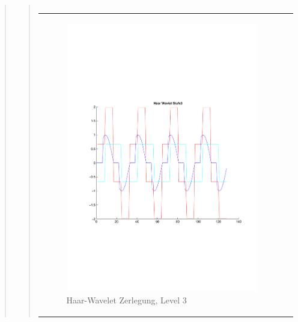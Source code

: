 \begin{quote}
\begin{quote}
\begin{center}
\begin{tabular}{ll}
                \end{tabular}
                \end{center}
                
                
                
          \begin{center}
                \begin{tabular}{ll}
    
                \hspace{-12em}
                    \begin{minipage}{0.6\textwidth}
    
                        \begin{figure}[H]
                            \label{fig:}
                            \includegraphics[scale=0.45, trim = 0.8cm 6cm 3cm
                            7.5cm,
                            clip]{./Bilder/Termin8/Haar_Wavlet_lvl_3}
                            \caption{Haar-Wavelet Zerlegung, Level 3}
                        \end{figure}
    

\end{minipage}
\end{tabular}
\end{center}
\end{quote}
\end{quote}
